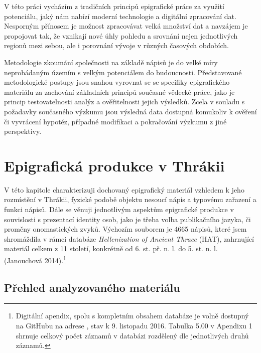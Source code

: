 V této práci vycházím z tradičních principů epigrafické práce za využití potenciálu, jaký nám nabízí moderní technologie a digitální zpracování dat. Nesporným přínosem je možnost zpracovávat velká množství dat a navzájem je propojovat tak, že vznikají nové úhly pohledu a srovnání nejen jednotlivých regionů mezi sebou, ale i porovnání vývoje v různých časových obdobích.

Metodologie zkoumání společnosti na základě nápisů je do velké míry neprobádaným územím s velkým potenciálem do budoucnosti. Představované metodologické postupy jsou snahou vyrovnat se se specifiky epigrafického materiálu za zachování základních principů současné vědecké práce, jako je princip testovatelnosti analýz a ověřitelnosti jejich výsledků. Zcela v souladu s požadavky současného výzkumu jsou výsledná data dostupná komukoliv k ověření či vyvrácení hypotéz, případné modifikaci a pokračování výzkumu z jiné perspektivy.

\chapter{Epigrafická produkce v Thrákii}
V této kapitole charakterizuji dochovaný epigrafický materiál vzhledem k jeho rozmístění v Thrákii, fyzické podobě objektu nesoucí nápis a typovému zařazení a funkci nápisů. Dále se věnuji jednotlivým aspektům epigrafické produkce v souvislosti s prezentací identity osob, jako je třeba volba publikačního jazyka, či proměny onomastických zvyků. Výchozím souborem je 4665 nápisů, které jsem shromáždila v rámci databáze {\em Hellenization of Ancient Thrace} (HAT), zahrnující materiál celkem z 11 století, konkrétně od 6. st. př. n. l. do 5. st. n. l. (Janouchová 2014).\footnote{Digitální apendix, spolu s kompletním obsahem databáze je volně dostupný na GitHubu na adrese \from[url18], stav k 9. listopadu 2016. Tabulka 5.00 v Apendixu 1 shrnuje celkový počet záznamů v databázi rozdělený dle jednotlivých druhů záznamů.}

\section[přehled-analyzovaného-materiálu]{Přehled analyzovaného materiálu}

